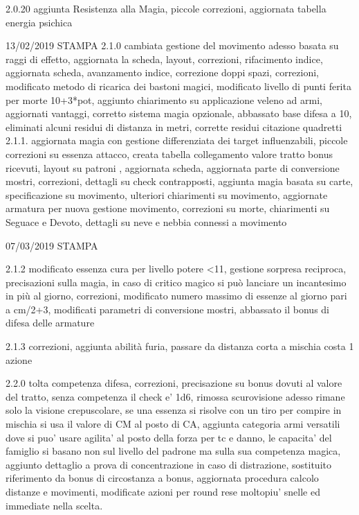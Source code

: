\documentclass[a4paper,11pt,twoside,openany]{book}
\begin{document}
{{	2.0.20 aggiunta Resistenza alla Magia, piccole correzioni, aggiornata tabella energia psichica

	13/02/2019 STAMPA
	2.1.0 cambiata gestione del movimento adesso basata su raggi di effetto, aggiornata la scheda, layout, correzioni, rifacimento indice, aggiornata scheda, avanzamento indice, correzione doppi spazi, correzioni, modificato metodo di ricarica dei bastoni magici, modificato livello di punti ferita per morte 10+3*pot, aggiunto chiarimento su applicazione veleno ad armi, aggiornati vantaggi, corretto sistema magia opzionale, abbassato base difesa a 10, eliminati alcuni residui di distanza in metri, corrette residui citazione quadretti 2.1.1. aggiornata magia con gestione differenziata dei target influenzabili, piccole correzioni su essenza attacco, creata tabella collegamento valore tratto bonus ricevuti, layout su patroni , aggiornata scheda, aggiornata parte di conversione mostri, correzioni, dettagli su check contrapposti, aggiunta magia basata su carte, specificazione su movimento, ulteriori chiarimenti su movimento, aggiornate armatura per nuova gestione movimento, correzioni su morte, chiarimenti su Seguace e Devoto, dettagli su neve e nebbia connessi a movimento

	07/03/2019 STAMPA

	2.1.2 modificato essenza cura per livello potere \textless11, gestione sorpresa reciproca, precisazioni sulla magia, in caso di critico magico si può lanciare un incantesimo in più al giorno, correzioni, modificato numero massimo di essenze al giorno pari a cm/2+3, modificati parametri di conversione mostri, abbassato il bonus di difesa delle armature

	2.1.3 correzioni, aggiunta abilità furia, passare da distanza corta a mischia costa 1 azione

	2.2.0 tolta competenza difesa, correzioni, precisazione su bonus dovuti al valore del tratto, senza competenza il check e’ 1d6, rimossa scurovisione adesso rimane solo la visione crepuscolare, se una essenza si risolve con un tiro per compire in mischia si usa il valore di CM al posto di CA, aggiunta categoria armi versatili dove si puo’ usare agilita’ al posto della forza per tc e danno, le capacita’ del famiglio si basano non sul livello del padrone ma sulla sua competenza magica, aggiunto dettaglio a prova di concentrazione in caso di distrazione, sostituito riferimento da bonus di circostanza a bonus, aggiornata procedura calcolo distanze e movimenti, modificate azioni per round rese moltopiu’ snelle ed immediate nella scelta.

}}
\end{document}
